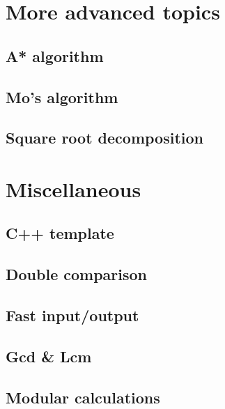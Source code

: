 \section{More advanced topics}
\subsection{A* algorithm}
\raggedbottom
\hrulefill
\subsection{Mo's algorithm}
\raggedbottom
\hrulefill
\subsection{Square root decomposition}
\raggedbottom
\hrulefill


\section{Miscellaneous}
\subsection{C++ template}
\raggedbottom
\hrulefill
\subsection{Double comparison}
\raggedbottom
\hrulefill
\subsection{Fast input/output}
\raggedbottom
\hrulefill
\subsection{Gcd \& Lcm}
\raggedbottom
\hrulefill
\subsection{Modular calculations}
\raggedbottom
\hrulefill
